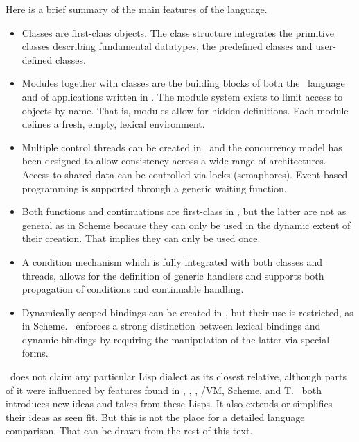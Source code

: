 \begin{introduction}
\begin{optDefinition}
\noindent
Here is a brief summary of the main features of the language.
\begin{itemize}

    \item Classes are first-class objects.  The class
    structure integrates the primitive classes
    describing fundamental datatypes, the predefined classes and user-defined
    classes.

    \item Modules together with classes are the building
    blocks of both the \eulisp\ language and of applications written in \eulisp.
    The module system exists to limit access to objects by name.  That is,
    modules allow for hidden definitions.  Each module defines a fresh, empty,
    lexical environment.

    \item Multiple control threads can be created in \eulisp\ and the
    concurrency model has been designed to allow consistency across a wide range
    of architectures.  Access to shared data can be controlled via locks
    (semaphores). Event-based programming is supported through a generic waiting
    function.

    \item Both functions and continuations are first-class in \eulisp, but the
    latter are not as general as in Scheme because they can only be used in the
    dynamic extent of their creation.  That implies they can only be used once.

    \item A condition mechanism which is fully integrated with both classes and
    threads, allows for the definition of generic handlers and supports both
    propagation of conditions and continuable handling.

    \item Dynamically scoped bindings
    can be created in \eulisp, but their use is restricted, as in Scheme.
    \eulisp\ enforces a strong distinction between lexical bindings and dynamic
    bindings by requiring the manipulation of the latter via special forms.

\end{itemize}
\eulisp\ does not claim any particular Lisp dialect as its closest relative,
although parts of it were influenced by features found in
\cl{}, \interlisp{},
\lelisp{},
\lisp/VM, Scheme, and
T. \eulisp\ both introduces new ideas and takes from these
Lisps.  It also extends or simplifies their ideas as seen fit.  But this is not
the place for a detailed language comparison.  That can be drawn from the rest
of this text.


\end{optDefinition}
\end{introduction}
